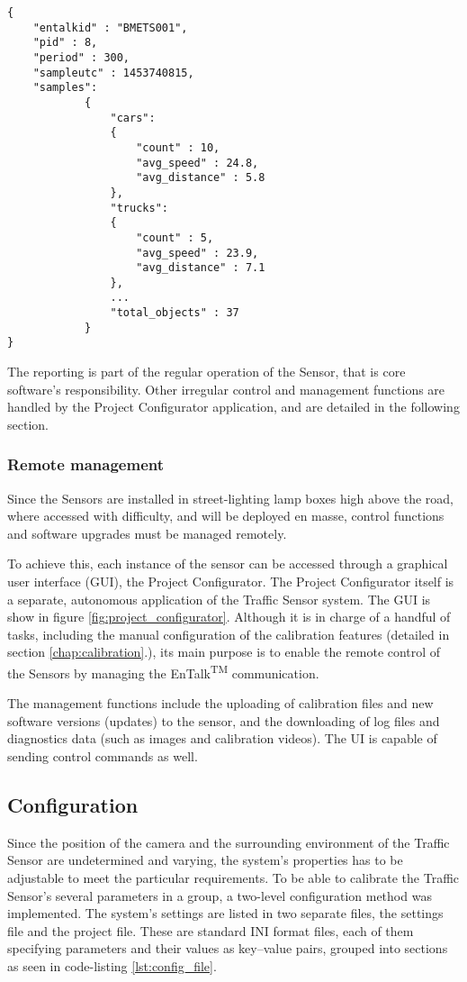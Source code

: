 \begin{lstlisting}[frame=single,float=!ht,caption={Part of a report file. The result of the counting is sent as a JSON syntax file, including the number of vehicles detected in each category.},label=lst:report_file]
{
	"entalkid" : "BMETS001",
	"pid" : 8,
	"period" : 300,
	"sampleutc" : 1453740815,
	"samples":
			{
				"cars":
				{
					"count" : 10,
					"avg_speed" : 24.8,
					"avg_distance" : 5.8
				},
				"trucks":
				{
					"count" : 5,
					"avg_speed" : 23.9,
					"avg_distance" : 7.1
				},
				...
				"total_objects" : 37
			}
}
\end{lstlisting}

The reporting is part of the regular operation of the Sensor, that is core software's responsibility.
Other irregular control and management functions are handled by the Project Configurator application, and are detailed in the following section.

\subsubsection{Remote management}
Since the Sensors are installed in street-lighting lamp boxes high above the road, where accessed with difficulty, and will be deployed en masse, control functions and software upgrades must be managed remotely.

To achieve this, each instance of the sensor can be accessed through a graphical user interface (GUI), the Project Configurator.
The Project Configurator itself is a separate, autonomous application of the Traffic Sensor system.
The GUI is show in figure \ref{fig:project_configurator}.
Although it is in charge of a handful of tasks, including the manual configuration of the calibration features (detailed in section \ref{chap:calibration}.), its main purpose is to enable the remote control of the Sensors by managing the EnTalk\textsuperscript{TM} communication.

The management functions include the uploading of calibration files and new software versions (updates) to the sensor, and the downloading of log files and diagnostics data (such as images and calibration videos).
The UI is capable of sending control commands as well.
\subsection{Configuration}\label{subs:ProjectConfigurator}
Since the position of the camera and the surrounding environment of the Traffic Sensor are undetermined and varying, the system's properties has to be adjustable to meet the particular requirements.
To be able to calibrate the Traffic Sensor's several parameters in a group, a two-level configuration method was implemented.
The system's settings are listed in two separate files, the settings file and the project file.
These are standard INI format files, each of them specifying parameters and their values as key--value pairs, grouped into sections as seen in code-listing \ref{lst:config_file}.

